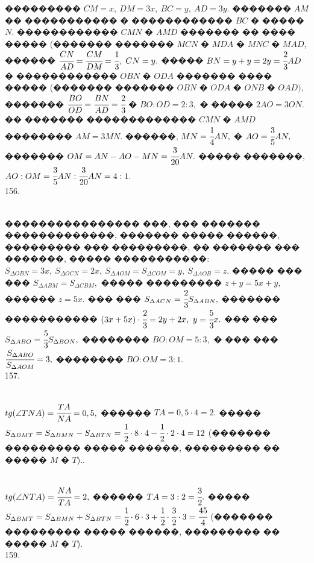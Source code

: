 \documentclass[12pt]{article}
\begin{document}
��������� $CM=x,\ DM=3x,\ BC=y,\ AD=3y.$ ������� $AM$ �� ����������� � ������������ $BC$ � ����� $N.$ ������������ $CMN$ � $AMD$ ������� �� ���� ����� (������� �������  $MCN$ � $MDA$ � $MNC$ � $MAD$, ������ $\cfrac{CN}{AD}=\cfrac{CM}{DM}=\cfrac{1}{3},\ CN=y.$ ����� $BN=y+y=2y=\cfrac{2}{3}AD$ � ������������ $OBN$ � $ODA$ ������� ���� ����� (������� ������� $OBN$ � $ODA$ � $ONB$ � $OAD),$ ������� $\cfrac{BO}{OD}=\cfrac{BN}{AD}=\cfrac{2}{3}$ � $BO:OD=2:3,$ � ����� $2AO=3ON.$ �� ������� ������������� $CMN$ � $AMD$ �������� $AM=3MN.$ ������, $MN=\cfrac{1}{4}AN,$ � $AO=\cfrac{3}{5}AN,$ ������� $OM=AN-AO-MN=\cfrac{3}{20}AN.$ ����� �������, $AO:OM=\cfrac{3}{5}AN:\cfrac{3}{20}AN=4:1.$\\
156. \begin{figure}[ht!]
\end{figure}\\
���������������� ���, ��� ������� �������������, ������� ����� ������, ��������� ��� ���������, �� ������� ��� �������, ����� �����������: $S_{\Delta OBN}=3x,\ S_{\Delta OCN}=2x,\ S_{\Delta AOM}=S_{\Delta COM}=y,\ S_{\Delta AOB}=z.$ ����� ��� ��� $S_{\Delta ABM}=S_{\Delta CBM},$ ����� ��������� $z+y=5x+y,$ ������ $z=5x.$ ��� ��� $S_{\Delta ACN}=\cfrac{2}{3}S_{\Delta ABN},$ ������� ����������� $(3x+5x)\cdot\cfrac{2}{3}=2y+2x,\ y=\cfrac{5}{3}x.$ ��� ��� $S_{\Delta ABO}=\cfrac{5}{3}S_{\Delta BON},$ �������� $BO:OM=5:3,$ � ��� ��� $\cfrac{S_{\Delta ABO}}{S_{\Delta AOM}}=3,$ �������� $BO:OM=3:1.$\\
157. \begin{figure}[ht!]
\end{figure}\\
$tg(\angle TNA)=\cfrac{TA}{NA}=0,5,$ ������ $TA=0,5\cdot4=2.$ ����� $S_{\Delta BMT}=S_{\Delta BMN}-S_{\Delta BTN}=\cfrac{1}{2}\cdot8\cdot4-\cfrac{1}{2}\cdot2\cdot4=12$ (������� ��������� ����� ������, ��������� �� ����� $M$ � $T$).\newpage{}. \begin{figure}[ht!]
\end{figure}\\
$tg(\angle NTA)=\cfrac{NA}{TA}=2,$ ������ $TA=3:2=\cfrac{3}{2}.$ ����� $S_{\Delta BMT}=S_{\Delta BMN}+S_{\Delta BTN}=\cfrac{1}{2}\cdot6\cdot3+\cfrac{1}{2}\cdot\cfrac{3}{2}\cdot3=\cfrac{45}{4}$ (������� ��������� ����� ������, ��������� �� ����� $M$ � $T$).\\
159. \begin{figure}[ht!]
\end{figure}\\
\end{document}

